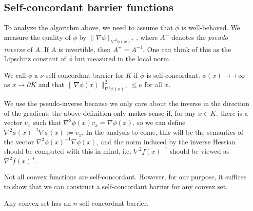 \subsection{Self-concordant barrier functions}

To analyze the algorithm above, we need to assume that $\phi$ is
well-behaved. We measure the quality of $\phi$ by $\|\nabla\phi\|_{\nabla^{2}\phi(x)^{+}}$,
where $A^{+}$ denotes the \emph{pseudo inverse} of $A$. If $A$
is invertible, then $A^{+}=A^{-1}$. One can think of this as the
Lipschitz constant of $\phi$ but measured in the local norm. 
\begin{defn}
We call $\phi$ a $\nu$-self-concordant barrier for $K$ if $\phi$
is self-concordant, $\phi(x)\rightarrow+\infty$ as $x\rightarrow\partial K$
and that $\|\nabla\phi(x)\|^{2}_{\nabla^{2}\phi(x)^{+}}\leq\nu$ for
all $x$.
\end{defn}

\begin{rem*}
We use the pseudo-inverse because we only care about the inverse in
the direction of the gradient: the above definition only makes sense
if, for any $x\in K$, there is a vector $v_{x}$ such that $\nabla^{2}\phi(x)v_{x}=\nabla\phi(x)$,
so we can define $\nabla^{2}\phi(x)^{-1}\nabla\phi(x):=v_{x}$. In
the analysis to come, this will be the semantics of the vector $\nabla^{2}\phi(x)^{-1}\nabla\phi(x)$,
and the norm induced by the inverse Hessian should be computed with
this in mind, i.e. $\nabla^{2}f(x)^{-1}$ should be viewed as $\nabla^{2}f(x)^{+}$.
\end{rem*}
Not all convex functions are self-concordant. However, for our purpose,
it suffices to show that we can construct a self-concordant barrier
for any convex set.
\begin{thm}
Any convex set has an $n$-self-concordant barrier.
\end{thm}

